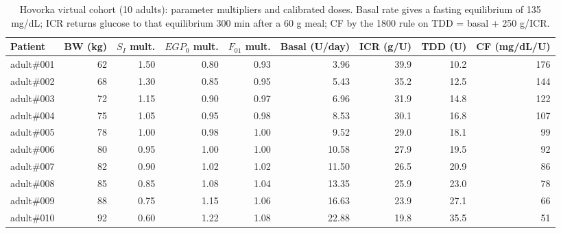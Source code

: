 \begin{table}[H]
\centering
\caption{Hovorka virtual cohort (10 adults): parameter multipliers and calibrated doses. Basal rate gives a fasting equilibrium of 135 mg/dL; ICR returns glucose to that equilibrium 300 min after a 60 g meal; CF by the 1800 rule on TDD = basal + 250 g/ICR.}\label{tab:S1}
\footnotesize
\begin{tabular}{lrrrrrrrr}
\toprule
Patient & BW (kg) & $S_I$ mult. & $EGP_0$ mult. & $F_{01}$ mult. & Basal (U/day) & ICR (g/U) & TDD (U) & CF (mg/dL/U) \\
\midrule
adult\#001 & 62 & 1.50 & 0.80 & 0.93 & 3.96 & 39.9 & 10.2 & 176 \\
adult\#002 & 68 & 1.30 & 0.85 & 0.95 & 5.43 & 35.2 & 12.5 & 144 \\
adult\#003 & 72 & 1.15 & 0.90 & 0.97 & 6.96 & 31.9 & 14.8 & 122 \\
adult\#004 & 75 & 1.05 & 0.95 & 0.98 & 8.53 & 30.1 & 16.8 & 107 \\
adult\#005 & 78 & 1.00 & 0.98 & 1.00 & 9.52 & 29.0 & 18.1 & 99 \\
adult\#006 & 80 & 0.95 & 1.00 & 1.00 & 10.58 & 27.9 & 19.5 & 92 \\
adult\#007 & 82 & 0.90 & 1.02 & 1.02 & 11.50 & 26.5 & 20.9 & 86 \\
adult\#008 & 85 & 0.85 & 1.08 & 1.04 & 13.35 & 25.9 & 23.0 & 78 \\
adult\#009 & 88 & 0.75 & 1.15 & 1.06 & 16.63 & 23.9 & 27.1 & 66 \\
adult\#010 & 92 & 0.60 & 1.22 & 1.08 & 22.88 & 19.8 & 35.5 & 51 \\
\bottomrule
\end{tabular}
\end{table}

